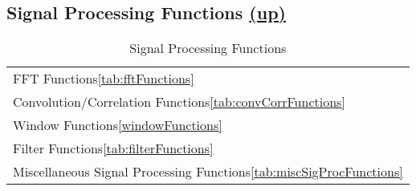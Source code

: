 \subsection*{Signal Processing Functions \hyperlink{VSIPspecHead}{(up)}}
\begin{table}[H]
\hypertarget{vsipljSignalProcessing}{}
\caption{Signal Processing Functions}
\label{tab:signalProcessingFunctions}
\begin{center}
\begin{tabular}{|l|}\hline
FFT Functions\ref{tab:fftFunctions}\\
Convolution/Correlation Functions\ref{tab:convCorrFunctions}\\
Window Functions\ref{windowFunctions}\\
Filter Functions\ref{tab:filterFunctions}\\
Miscellaneous Signal Processing Functions\ref{tab:miscSigProcFunctions}\\
\hline\end{tabular}
\end{center}
\label{default}
\end{table}%